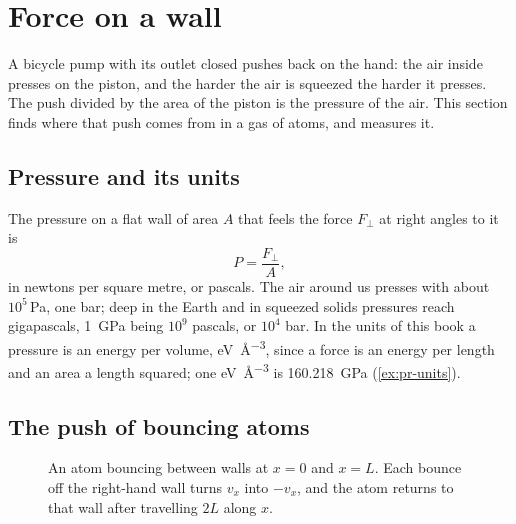 \section{Force on a wall}
\label{sec:pr-wall}

A bicycle pump with its outlet closed pushes back on the hand: the air
inside presses on the piston, and the harder the air is squeezed the
harder it presses. The push divided by the area of the piston is the
pressure of the air. This section finds where that push comes from in a
gas of atoms, and measures it.

\subsection*{Pressure and its units}

The pressure on a flat wall of area $A$ that feels the force
$F_\perp$ at right angles to it is
\begin{equation*}
   P = \frac{F_\perp}{A} ,
\end{equation*}
in newtons per square metre, or pascals. The air around us presses with
about $10^5$\,\si{\pascal}, one bar; deep in the Earth and in squeezed
solids pressures reach gigapascals, \SI{1}{\giga\pascal} being $10^9$
pascals, or $10^4$ bar. In the units of this book a pressure is an
energy per volume, \si{\electronvolt\per\angstrom\cubed}, since a force is
an energy per length and an area a length squared; one
\si{\electronvolt\per\angstrom\cubed} is \SI{160.218}{\giga\pascal}
(\cref{ex:pr-units}).

\subsection*{The push of bouncing atoms}

\begin{figure}[htb]
\centering
{}
\caption{An atom bouncing between walls at $x = 0$ and $x = L$. Each
bounce off the right-hand wall turns $v_x$ into $-v_x$, and the atom
returns to that wall after travelling $2L$ along $x$.}
\label{fig:pr-bounce}
\end{figure}

